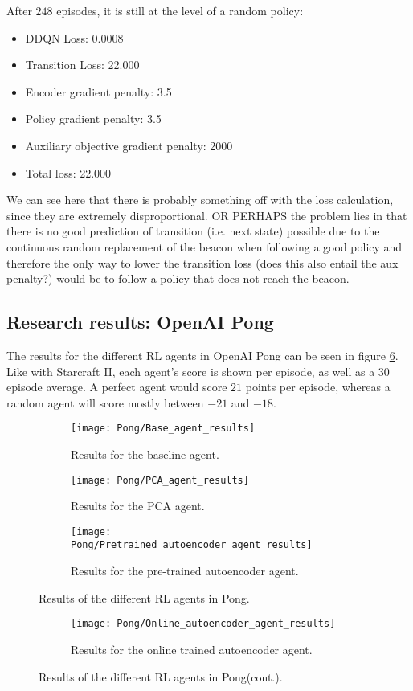 After $248$ episodes, it is still at the level of a random policy:
\begin{itemize}
\item DDQN Loss: 0.0008 
\item Transition Loss: 22.000
\item Encoder gradient penalty: 3.5
\item Policy gradient penalty: 3.5
\item Auxiliary objective gradient penalty: 2000
\item Total loss: 22.000
\end{itemize}

We can see here that there is probably something off with the loss calculation, since they are extremely disproportional.
OR PERHAPS the problem lies in that there is no good prediction of transition (i.e. next state) possible due to the continuous random replacement of the beacon when following a good policy and therefore the only way to lower the transition loss (does this also entail the aux penalty?) would be to follow a policy that does not reach the beacon.

\subsection{Research results: OpenAI Pong}\label{research-results-pong}
The results for the different RL agents in OpenAI Pong can be seen in figure \ref{fig:results-agents-pong}. Like with Starcraft II, each agent's score is shown per episode, as well as a $30$ episode average. A perfect agent would score $21$ points per episode, whereas a random agent will score mostly between $-21$ and $-18$.

\begin{figure}[h!]
	\centering
	\begin{subfigure}[b]{0.75\textwidth}
		\texttt{[image: Pong/Base\_agent\_results]}
		\caption{Results for the baseline agent.}
		\label{fig:results-base-pong} 
	\end{subfigure}
	\begin{subfigure}[b]{0.75\textwidth}
		\texttt{[image: Pong/PCA\_agent\_results]}
		\caption{Results for the PCA agent.}
		\label{fig:results-pca-pong}
	\end{subfigure}
	\begin{subfigure}[b]{0.75\textwidth}
		\texttt{[image: Pong/Pretrained\_autoencoder\_agent\_results]}
		\caption{Results for the pre-trained autoencoder agent.}
		\label{fig:results-ae-pong}
	\end{subfigure}
	\caption{Results of the different RL agents in Pong.}
\end{figure}%
\begin{figure}[ht]\ContinuedFloat
	\begin{subfigure}[b]{0.75\textwidth}
		\texttt{[image: Pong/Online\_autoencoder\_agent\_results]}
		\caption{Results for the online trained autoencoder agent.}
		\label{fig:results-online-ae-pong}
	\end{subfigure}
	\caption{Results of the different RL agents in Pong(cont.).}
	\label{fig:results-agents-pong}
\end{figure}

